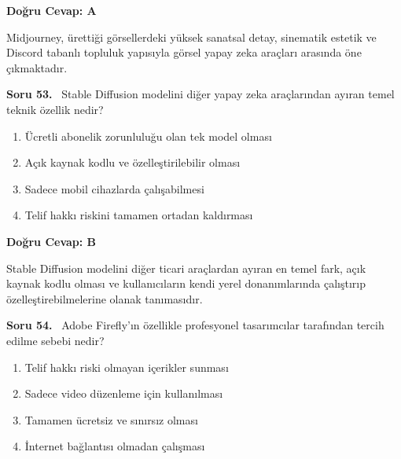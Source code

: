 \documentclass[11pt,a4paper,openany]{book}
\begin{document}
\vspace{4pt}
\begin{tcolorbox}[title=Cevap ve Açıklama, colback=gray!3!white, colframe=primarycolor!90!black, arc=2mm, fonttitle=\bfseries\sffamily, top=6pt, bottom=6pt]
    \textbf{Doğru Cevap: A}

    \vspace{2pt}
    Midjourney, ürettiği görsellerdeki yüksek sanatsal detay, sinematik estetik ve Discord tabanlı topluluk yapısıyla görsel yapay zeka araçları arasında öne çıkmaktadır.
\end{tcolorbox}
\vspace{10pt}
\needspace{5cm}
\vspace{8pt}
\noindent\textbf{\large\sffamily Soru 53.} \ Stable Diffusion modelini diğer yapay zeka araçlarından ayıran temel teknik özellik nedir?

\begin{enumerate}[label=\Alph*), leftmargin=25pt, topsep=4pt, itemsep=2pt]
        \item Ücretli abonelik zorunluluğu olan tek model olması
        \item Açık kaynak kodlu ve özelleştirilebilir olması
        \item Sadece mobil cihazlarda çalışabilmesi
        \item Telif hakkı riskini tamamen ortadan kaldırması
\end{enumerate}

\vspace{4pt}
\begin{tcolorbox}[title=Cevap ve Açıklama, colback=gray!3!white, colframe=primarycolor!90!black, arc=2mm, fonttitle=\bfseries\sffamily, top=6pt, bottom=6pt]
    \textbf{Doğru Cevap: B}

    \vspace{2pt}
    Stable Diffusion modelini diğer ticari araçlardan ayıran en temel fark, açık kaynak kodlu olması ve kullanıcıların kendi yerel donanımlarında çalıştırıp özelleştirebilmelerine olanak tanımasıdır.
\end{tcolorbox}
\vspace{10pt}
\needspace{5cm}
\vspace{8pt}
\noindent\textbf{\large\sffamily Soru 54.} \ Adobe Firefly'ın özellikle profesyonel tasarımcılar tarafından tercih edilme sebebi nedir?

\begin{enumerate}[label=\Alph*), leftmargin=25pt, topsep=4pt, itemsep=2pt]
        \item Telif hakkı riski olmayan içerikler sunması
        \item Sadece video düzenleme için kullanılması
        \item Tamamen ücretsiz ve sınırsız olması
        \item İnternet bağlantısı olmadan çalışması
\end{enumerate}
\end{document}

